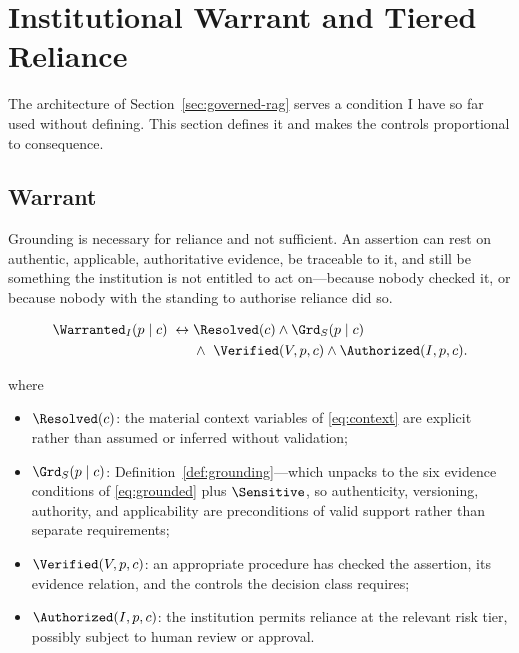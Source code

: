 \section{Institutional Warrant and Tiered Reliance}
\label{sec:tiers}

The architecture of Section~\ref{sec:governed-rag} serves a condition I have so far
used without defining. This section defines it and makes the controls proportional
to consequence.

\subsection{Warrant}

Grounding is necessary for reliance and not sufficient. An assertion can rest on
authentic, applicable, authoritative evidence, be traceable to it, and still be
something the institution is not entitled to act on---because nobody checked it, or
because nobody with the standing to authorise reliance did so.

\begin{definition}
\label{def:warrant}
\begin{equation}
  \begin{aligned}
  \Warranted_I(p \mid c) \;\leftrightarrow\;
    &\Resolved(c) \wedge \Grd_S(p \mid c)\\
    &\wedge\ \Verified(V, p, c) \wedge \Authorized(I, p, c).
  \end{aligned}
  \label{eq:warrant}
\end{equation}
\end{definition}

where

\begin{itemize}
  \item $\Resolved(c)$: the material context variables of \eqref{eq:context} are
        explicit rather than assumed or inferred without validation;
  \item $\Grd_S(p \mid c)$: Definition~\ref{def:grounding}---which unpacks to the
        six evidence conditions of \eqref{eq:grounded} plus $\Sensitive$, so
        authenticity, versioning, authority, and applicability are preconditions of
        valid support rather than separate requirements;
  \item $\Verified(V, p, c)$: an appropriate procedure has checked the assertion,
        its evidence relation, and the controls the decision class requires;
  \item $\Authorized(I, p, c)$: the institution permits reliance at the relevant
        risk tier, possibly subject to human review or approval.
\end{itemize}

